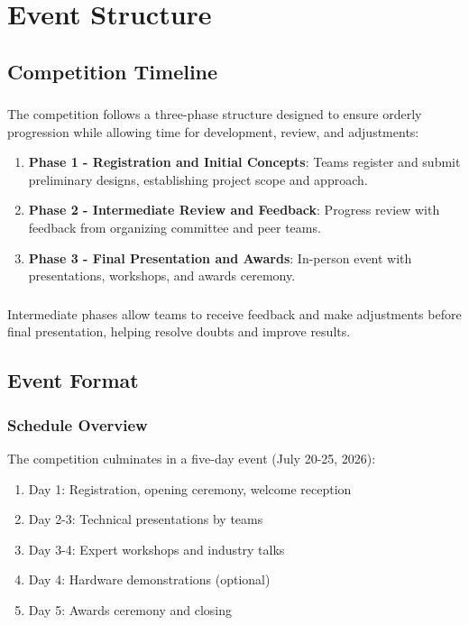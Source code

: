 
\renewcommand{\thesection}{ES}
\section{Event Structure}

\subsection{Competition Timeline}

\subsubsection{}
The competition follows a three-phase structure designed to ensure orderly progression while allowing time for development, review, and adjustments:

\begin{enumerate}[noitemsep]
    \item \textbf{Phase 1 - Registration and Initial Concepts}: Teams register and submit preliminary designs, establishing project scope and approach.
    \item \textbf{Phase 2 - Intermediate Review and Feedback}: Progress review with feedback from organizing committee and peer teams.
    \item \textbf{Phase 3 - Final Presentation and Awards}: In-person event with presentations, workshops, and awards ceremony.
\end{enumerate}

\subsubsection{}
Intermediate phases allow teams to receive feedback and make adjustments before final presentation, helping resolve doubts and improve results.

\subsection{Event Format}

\subsubsection{Schedule Overview}
The competition culminates in a five-day event (July 20-25, 2026):

\begin{enumerate}[noitemsep]
    \item Day 1: Registration, opening ceremony, welcome reception
    \item Day 2-3: Technical presentations by teams
    \item Day 3-4: Expert workshops and industry talks
    \item Day 4: Hardware demonstrations (optional)
    \item Day 5: Awards ceremony and closing
\end{enumerate}

